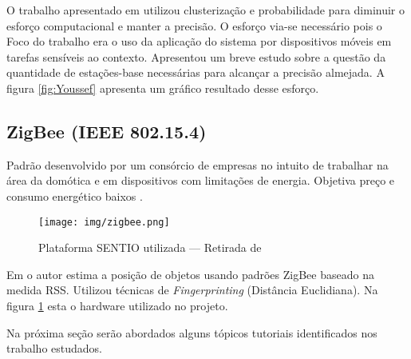 O trabalho apresentado em \cite{Youssef2003} utilizou clusterização e probabilidade para diminuir o esforço computacional e manter a precisão. O esforço via-se necessário pois o Foco do trabalho era o uso da aplicação do sistema por dispositivos móveis em tarefas sensíveis ao contexto. Apresentou um breve estudo sobre a questão da quantidade de estações-base necessárias para alcançar a precisão almejada. A figura \ref{fig:Youssef} apresenta um gráfico resultado desse esforço.


\subsection*{ZigBee (IEEE 802.15.4)}

Padrão desenvolvido por um consórcio de empresas no intuito de trabalhar na área da domótica e em dispositivos com limitações de energia. Objetiva preço e consumo energético baixos \cite{Drake2010}.

\begin{figure}[ht]
\centering
\texttt{[image: img/zigbee.png]}
\caption{Plataforma SENTIO utilizada --- Retirada de \cite{Tadakamadla2006}\label{fig:zigbee}}
\end{figure}

Em \cite{Tadakamadla2006} o autor estima a posição de objetos usando padrões ZigBee baseado na medida RSS. Utilizou técnicas de \textit{Fingerprinting} (Distância Euclidiana). Na figura \ref{fig:zigbee} esta o hardware utilizado no projeto.

Na próxima seção serão abordados alguns tópicos tutoriais identificados nos trabalho estudados.

